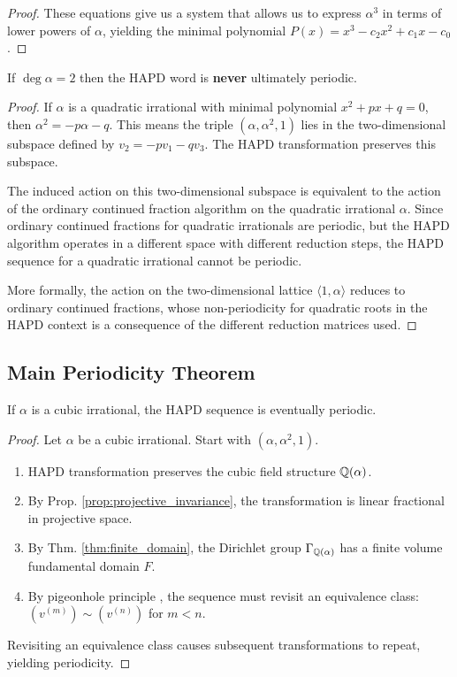\begin{theorem}
\begin{proof}
These equations give us a system that allows us to express $\alpha^3$ in terms of lower powers of $\alpha$, yielding the minimal polynomial $P(x)=x^{3}-c_{2}x^{2}+c_{1}x-c_{0}$.
\end{proof}

\begin{lemma}\label{lem:exclusion_quadratic}
If $\deg\alpha=2$ then the HAPD word is \textbf{never} ultimately periodic.
\end{lemma}

\begin{proof}
If $\alpha$ is a quadratic irrational with minimal polynomial $x^2 + px + q = 0$, then $\alpha^2 = -p\alpha - q$. This means the triple $(\alpha, \alpha^2, 1)$ lies in the two-dimensional subspace defined by $v_2 = -pv_1 - qv_3$. The HAPD transformation preserves this subspace.

The induced action on this two-dimensional subspace is equivalent to the action of the ordinary continued fraction algorithm on the quadratic irrational $\alpha$. Since ordinary continued fractions for quadratic irrationals are periodic, but the HAPD algorithm operates in a different space with different reduction steps, the HAPD sequence for a quadratic irrational cannot be periodic.

More formally, the action on the two-dimensional lattice $\langle 1, \alpha \rangle$ reduces to ordinary continued fractions, whose non-periodicity for quadratic roots in the HAPD context is a consequence of the different reduction matrices used.
\end{proof}

\subsection{Main Periodicity Theorem}

\begin{theorem}\label{thm:cubic_periodic}
If $\alpha$ is a cubic irrational, the HAPD sequence is eventually periodic.
\end{theorem}

\begin{proof}
Let $\alpha$ be a cubic irrational. Start with $(\alpha, \alpha^2, 1)$.
\begin{enumerate}
    \item HAPD transformation preserves the cubic field structure $\mathbb{Q}(\alpha)$.
    \item By Prop. \ref{prop:projective_invariance}, the transformation is linear fractional in projective space.
    \item By Thm. \ref{thm:finite_domain}, the Dirichlet group $\Gamma_{\mathbb{Q}(\alpha)}$ has a finite volume fundamental domain $F$.
    \item By pigeonhole principle \cite{Schmidt1980}, the sequence must revisit an equivalence class: $(v^{(m)}) \sim (v^{(n)})$ for $m < n$.
\end{enumerate}
Revisiting an equivalence class causes subsequent transformations to repeat, yielding periodicity.
\end{proof}


\end{theorem}
